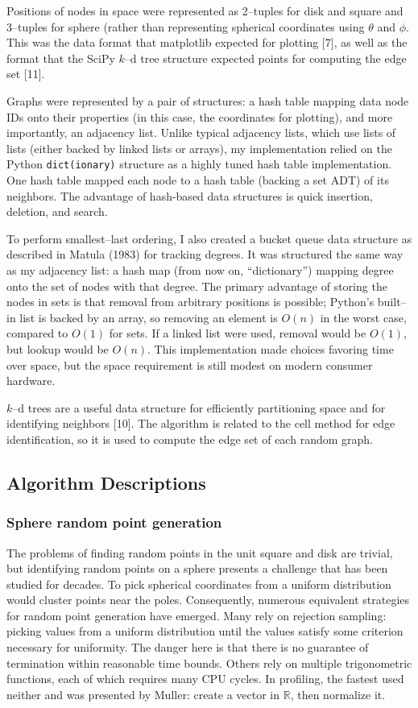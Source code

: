 \documentclass[oneside, titlepage]{scrartcl}
\begin{document}
Positions of nodes in space were represented as 2--tuples for disk and square and 3--tuples for sphere (rather than representing spherical coordinates using $\theta$ and $\phi$. This was the data format that matplotlib expected for plotting [7], as well as the format that the SciPy $k$--d tree structure expected points for computing the edge set [11].

Graphs were represented by a pair of structures: a hash table mapping data node IDs onto their properties (in this case, the coordinates for plotting), and more importantly, an adjacency list. Unlike typical adjacency lists, which use lists of lists (either backed by linked lists or arrays), my implementation relied on the Python \texttt{dict(ionary)} structure as a highly tuned hash table implementation. One hash table mapped each node to a hash table (backing a set ADT) of its neighbors. The advantage of hash-based data structures is quick insertion, deletion, and search.

To perform smallest--last ordering, I also created a bucket queue data structure as described in Matula (1983) for tracking degrees. It was structured the same way as my adjacency list: a hash map (from now on, ``dictionary'') mapping degree onto the set of nodes with that degree. The primary advantage of storing the nodes in sets is that removal from arbitrary positions is possible; Python's built--in list is backed by an array, so removing an element is $O(n)$ in the worst case, compared to $O(1)$ for sets. If a linked list were used, removal would be $O(1)$, but lookup would be $O(n)$. This implementation made choices favoring time over space, but the space requirement is still modest on modern consumer hardware.

$k$--d trees are a useful data structure for efficiently partitioning space and for identifying neighbors [10]. The algorithm is related to the cell method for edge identification, so it is used to compute the edge set of each random graph.

\subsection{Algorithm Descriptions}

\subsubsection{Sphere random point generation}

The problems of finding random points in the unit square and disk are trivial, but identifying random points on a sphere presents a challenge that has been studied for decades. To pick spherical coordinates from a uniform distribution would cluster points near the poles. Consequently, numerous equivalent strategies for random point generation have emerged. Many rely on rejection sampling: picking values from a uniform distribution until the values satisfy some criterion necessary for uniformity. The danger here is that there is no guarantee of termination within reasonable time bounds. Others rely on multiple trigonometric functions, each of which requires many CPU cycles. In profiling, the fastest used neither and was presented by Muller: create a vector in $\mathbb{R}$, then normalize it.
\end{document}

